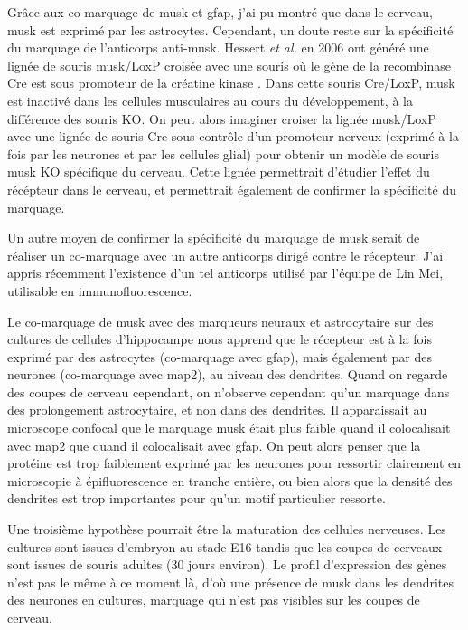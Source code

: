 Grâce aux co-marquage de \gls{musk} et \gls{gfap}, j'ai pu montré que dans le cerveau, \gls{musk} est exprimé par les astrocytes. Cependant,  un doute reste sur la spécificité du marquage de l'anticorps anti-\gls{musk}. Hessert \emph{et al.} en 2006 ont généré une lignée de souris \gls{musk}/LoxP croisée avec une souris où le gène de la recombinase Cre est sous promoteur de la créatine kinase \cite{Hesser2006a}. Dans cette souris Cre/LoxP, \gls{musk} est inactivé dans les cellules musculaires au cours du développement, à la différence des souris KO. On peut alors imaginer croiser la lignée \gls{musk}/LoxP avec une lignée de souris Cre sous contrôle d'un promoteur nerveux (exprimé à la fois par les neurones et par les cellules glial) pour obtenir un modèle de souris \gls{musk} KO spécifique du cerveau. Cette lignée permettrait d'étudier l'effet du récépteur dans le cerveau, et permettrait également de confirmer la spécificité du marquage.

Un autre moyen de confirmer la spécificité du marquage de \gls{musk} serait de réaliser un co-marquage avec un autre anticorps dirigé contre le récepteur. J'ai appris récemment l'existence d'un tel anticorps utilisé par l'équipe de Lin Mei, utilisable en immunofluorescence.

Le co-marquage de \gls{musk} avec des marqueurs neuraux et astrocytaire sur des cultures de cellules d'hippocampe nous apprend que le récepteur est à la fois exprimé par des astrocytes (co-marquage avec \gls{gfap}), mais également par des neurones (co-marquage avec \gls{map2}), au niveau des dendrites. Quand on regarde des coupes de cerveau cependant, on n'observe cependant qu'un marquage dans des prolongement astrocytaire, et non dans des dendrites. Il apparaissait au microscope confocal que le marquage \gls{musk} était plus faible quand il colocalisait avec \gls{map2} que quand il colocalisait avec \gls{gfap}. On peut alors penser que la protéine est trop faiblement exprimé par les neurones pour ressortir clairement en microscopie à épifluorescence en tranche entière, ou bien alors que la densité des dendrites est trop importantes pour qu'un motif particulier ressorte. 

Une troisième hypothèse pourrait être la maturation des  cellules nerveuses. Les cultures sont issues d'embryon au stade E16 tandis que les coupes de cerveaux sont issues de souris adultes (30 jours environ). Le profil d'expression des gènes n'est pas le même à ce moment là, d'où une présence de \gls{musk} dans les dendrites des neurones en cultures, marquage qui n'est pas visibles sur les coupes de cerveau. 

